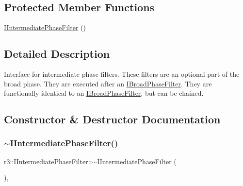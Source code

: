 \subsection*{Protected Member Functions}
\begin{DoxyCompactItemize}
\item 
\mbox{\hyperlink{classr3_1_1_i_intermediate_phase_filter_a22779c8595810d4068bfaaa140e39e0b}{I\+Intermediate\+Phase\+Filter}} ()
\end{DoxyCompactItemize}


\subsection{Detailed Description}
Interface for intermediate phase filters. These filters are an optional part of the broad phase. They are executed after an \mbox{\hyperlink{classr3_1_1_i_broad_phase_filter}{I\+Broad\+Phase\+Filter}}. They are functionally identical to an \mbox{\hyperlink{classr3_1_1_i_broad_phase_filter}{I\+Broad\+Phase\+Filter}}, but can be chained. 

\subsection{Constructor \& Destructor Documentation}
\mbox{\label{classr3_1_1_i_intermediate_phase_filter_ab2257ec90263c444371f455078e5ff7c}} 
\subsubsection{\texorpdfstring{$\sim$\+I\+Intermediate\+Phase\+Filter()}{~IIntermediatePhaseFilter()}}
{\footnotesize\ttfamily r3\+::\+I\+Intermediate\+Phase\+Filter\+::$\sim$\+I\+Intermediate\+Phase\+Filter (\begin{DoxyParamCaption}{ }\end{DoxyParamCaption})\hspace{0.3cm}{\ttfamily [virtual]}, {\ttfamily [default]}}

\mbox{\label{classr3_1_1_i_intermediate_phase_filter_a22779c8595810d4068bfaaa140e39e0b}} 
